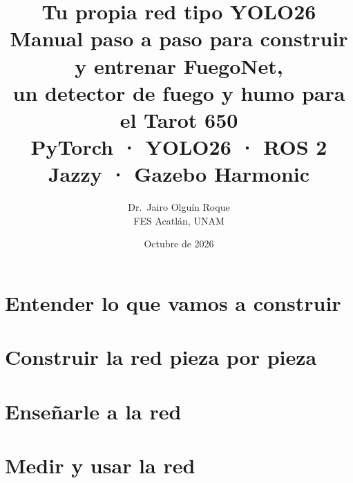 \documentclass[11pt,letterpaper,oneside,openany]{book}
\title{\textbf{Tu propia red tipo YOLO26}\\[6pt]
\Large Manual paso a paso para construir y entrenar FuegoNet,\\
un detector de fuego y humo para el Tarot 650\\[10pt]
\large PyTorch · YOLO26 · ROS 2 Jazzy · Gazebo Harmonic}
\author{Dr.\ Jairo Olguín Roque\\
FES Acatlán, UNAM}
\date{Octubre de 2026}
\begin{document}
\frontmatter
\maketitle
\tableofcontents


\mainmatter
\part{Entender lo que vamos a construir}



\part{Construir la red pieza por pieza}



\part{Enseñarle a la red}





\part{Medir y usar la red}




\appendix

\end{document}
